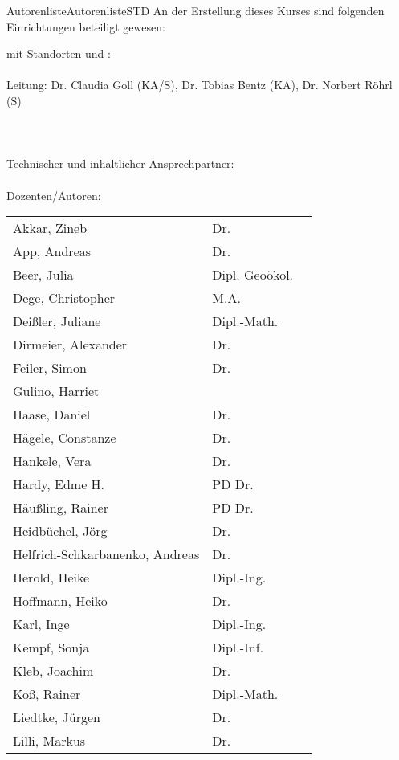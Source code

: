 \begin{MXContent}{Autorenliste}{Autorenliste}{STD}
An der Erstellung dieses Kurses sind folgenden Einrichtungen beteiligt gewesen:

 mit Standorten  und :\\
\ \\
Leitung: Dr. Claudia Goll (KA/S), Dr. Tobias Bentz (KA), Dr. Norbert Röhrl (S)\\ \ \\
\ \\ \ \\
Technischer und inhaltlicher Ansprechpartner: 
\ \\ \ \\
Dozenten/Autoren:\\
\begin{tabular}{lll}
Akkar, Zineb&Dr.& \\
App, Andreas&Dr.& \\
Beer, Julia&Dipl. Geoökol.& \\
Dege, Christopher&M.A.& \\
Deißler, Juliane&Dipl.-Math.& \\
Dirmeier, Alexander&Dr.& \\
Feiler, Simon&Dr.& \\
Gulino, Harriet& \\
Haase, Daniel&Dr.& \\
Hägele, Constanze&Dr.& \\
Hankele, Vera&Dr.&\\
Hardy, Edme H.&PD Dr.& \\
Häußling, Rainer&PD Dr.& \\
Heidbüchel, Jörg&Dr.&\\
Helfrich-Schkarbanenko, Andreas&Dr.& \\
Herold, Heike&Dipl.-Ing.&\\
Hoffmann, Heiko&Dr.&\\
Karl, Inge&Dipl.-Ing.& \\
Kempf, Sonja&Dipl.-Inf.& \\
Kleb, Joachim&Dr.& \\
Koß, Rainer&Dipl.-Math.& \\
Liedtke, Jürgen&Dr.&\\
Lilli, Markus&Dr.& \\

\end{tabular}
\end{MXContent}
